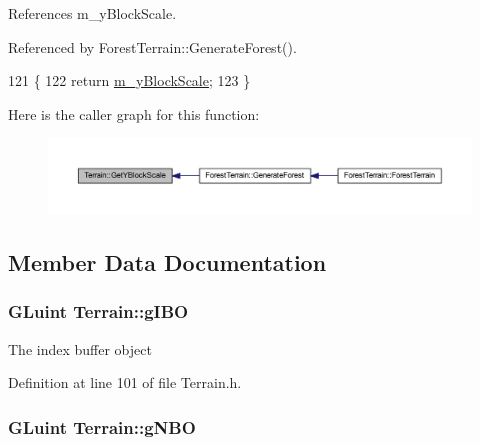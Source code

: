 References m\+\_\+y\+Block\+Scale.



Referenced by Forest\+Terrain\+::\+Generate\+Forest().


\begin{DoxyCode}
121 \{
122   \textcolor{keywordflow}{return} \hyperlink{class_terrain_a265cfbe55c45e80dade2f9dfe77d5055}{m\_yBlockScale};
123 \}
\end{DoxyCode}


Here is the caller graph for this function\+:
\nopagebreak
\begin{figure}[H]
\begin{center}
\leavevmode
\includegraphics[width=350pt]{class_terrain_a516ec45b81582973a7620eae202425d8_icgraph}
\end{center}
\end{figure}




\subsection{Member Data Documentation}
\subsubsection[{\texorpdfstring{g\+I\+BO}{gIBO}}]{\setlength{\rightskip}{0pt plus 5cm}G\+Luint Terrain\+::g\+I\+BO\hspace{0.3cm}{\ttfamily [private]}}\hypertarget{class_terrain_a5c60778885e518bb5081c2f85ab0146a}{}\label{class_terrain_a5c60778885e518bb5081c2f85ab0146a}


The index buffer object 



Definition at line 101 of file Terrain.\+h.

\subsubsection[{\texorpdfstring{g\+N\+BO}{gNBO}}]{\setlength{\rightskip}{0pt plus 5cm}G\+Luint Terrain\+::g\+N\+BO\hspace{0.3cm}{\ttfamily [private]}}\hypertarget{class_terrain_a5ad7a9eeec86bdb40e4c124b1b889bd3}{}\label{class_terrain_a5ad7a9eeec86bdb40e4c124b1b889bd3}


